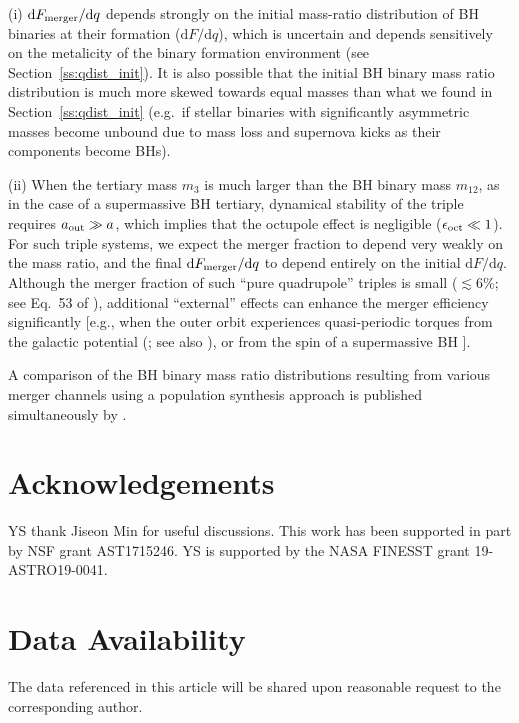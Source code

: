 \documentclass[
        fleqn,
        usenatbib,
    ]{mnras}
\newcommand*{\md}[0]{\mathrm{d}}
\begin{document}
(i) $\md F_{\rm merger}/\md q$ depends strongly on the initial mass-ratio
distribution of BH binaries at their formation ($\md F/\md q$), which is
uncertain and depends sensitively on the metalicity of the binary formation
environment (see Section~\ref{ss:qdist_init}). It is also possible that the
initial BH binary mass ratio distribution is much more skewed towards equal
masses than what we found in Section~\ref{ss:qdist_init} (e.g.\ if stellar
binaries with significantly asymmetric masses become unbound due to mass loss
and supernova kicks as their components become BHs).

(ii) When the tertiary mass $m_3$ is much larger than the BH binary mass
$m_{12}$, as in the case of a supermassive BH tertiary, dynamical stability of
the triple requires $a_{\rm out} \gg a$, which implies that the octupole effect
is negligible ($\epsilon_{\rm oct}\ll 1$). For such triple systems, we expect
the merger fraction to depend very weakly on the mass ratio, and the final $\md
F_{\rm merger}/\md q$ to depend entirely on the initial $\md F/\md q$. Although
the merger fraction of such ``pure quadrupole'' triples is small ($\lesssim
6\%$; see Eq.~53 of \citealp{LL18}), additional ``external'' effects can enhance
the merger efficiency significantly [e.g., when the outer orbit experiences
quasi-periodic torques from the galactic potential
(\citealp{petrovich2017greatly}; see also \citealp{hamers2017secular}), or from
the spin of a supermassive BH \citep{LLW_apjl}].

A comparison of the BH binary mass ratio distributions resulting from various
merger channels using a population synthesis approach is published
simultaneously by \citet{giacomo_inprep}.

\section{Acknowledgements}\label{s:ack}

YS thank Jiseon Min for useful discussions. This work has been supported in part
by NSF grant AST1715246. YS is supported by the NASA FINESST grant
19-ASTRO19-0041.%

\section{Data Availability}

The data referenced in this article will be shared upon reasonable request to
the corresponding author.
\end{document}
